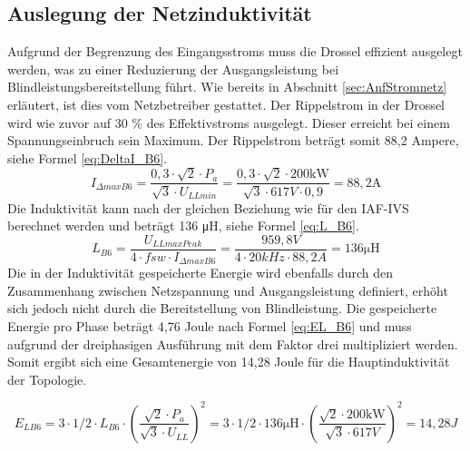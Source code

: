 		\subsection{Auslegung der Netzinduktivität}
			Aufgrund der Begrenzung des Eingangsstroms muss die Drossel effizient ausgelegt werden, was zu einer Reduzierung der Ausgangsleistung bei Blindleistungsbereitstellung führt. Wie bereits in Abschnitt \ref{sec:AnfStromnetz} erläutert, ist dies vom Netzbetreiber gestattet. Der Rippelstrom in der Drossel wird wie zuvor auf 30 \% des Effektivstroms ausgelegt. Dieser erreicht bei einem Spannungseinbruch sein Maximum. Der Rippelstrom beträgt somit 88,2 Ampere, siehe Formel \ref{eq:DeltaI_B6}.\\
			
			\begin{equation}
				\label{eq:DeltaI_B6}
				I_{\Delta max B6}= \dfrac{0,3 \cdot \sqrt{2} \cdot P_{a}}{\sqrt{3}\cdot U_{LLmin}}= \dfrac{0,3\cdot \sqrt{2} \cdot 200 \si{\kilo \watt}}{\sqrt{3} \cdot 617 \si{V} \cdot 0,9} = 88,2 \si{\A}
			\end{equation}
			Die Induktivität kann nach der gleichen Beziehung wie für den \gls{IAF}-\gls{IVS} berechnet werden und beträgt 136 \si{\micro \henry}, siehe Formel \ref{eq:L_B6}.
			\begin{equation}
				\label{eq:L_B6}
				L_{B6}= \dfrac{U_{LLmaxPeak}}{4\cdot f{sw} \cdot I_{\Delta max B6}} = \dfrac{959,8V}{4 \cdot 20 kHz \cdot 88,2 A} =136 \si{\micro \henry}
			\end{equation}
			Die in der Induktivität gespeicherte Energie wird ebenfalls durch den Zusammenhang zwischen Netzspannung und Ausgangsleistung definiert, erhöht sich jedoch nicht durch die Bereitstellung von Blindleistung. Die gespeicherte Energie pro Phase beträgt 4,76 Joule nach Formel \ref{eq:EL_B6} und muss aufgrund der dreiphasigen Ausführung mit dem Faktor drei multipliziert werden. Somit ergibt sich eine Gesamtenergie von 14,28 Joule für die Hauptinduktivität der Topologie.
			
			\begin{equation}
			\label{eq:EL_B6}
			E_{LB6}= 3 \cdot 1/2 \cdot L_{B6} \cdot (\dfrac{\sqrt{2} \cdot P_{a}}{\sqrt{3}\cdot U_{LL}})^{2}= 3 \cdot 1/2 \cdot 136 \si{\micro \henry} \cdot ({\dfrac{\sqrt{2} \cdot 200 \si{\kilo \watt} }{\sqrt{3} \cdot 617 V}})^{2} = 14,28 J
			\end{equation}
			
			

		
